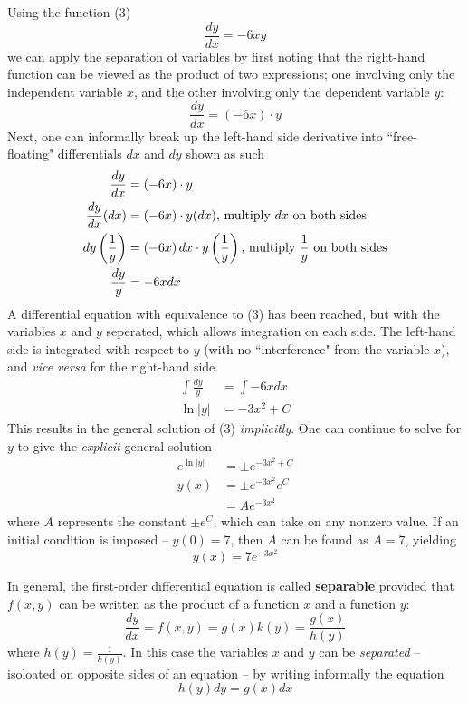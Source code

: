 \documentclass{article}
\begin{document}
Using the function (3)
$$ \frac{dy}{dx} = -6xy $$
we can apply the separation of variables by first noting that the right-hand function can be viewed as the product of two expressions; one involving only the independent variable $ x $, and the other involving only the dependent variable $ y $:
\begin{equation}
    \frac{dy}{dx} = \left( -6x \right) \cdot y
\end{equation}
Next, one can informally break up the left-hand side derivative into ``free-floating" differentials $ dx $ and $ dy $ shown as such
\begin{align}
    \frac{dy}{dx} & = \left( -6x \right) \cdot y \\
    \frac{dy}{dx} (dx) & = \left( -6x \right) \cdot y (dx) \text{, multiply $ dx $ on both sides} \\
    dy \left( \frac{1}{y} \right) & = \left( -6x \right) dx \cdot y \left( \frac{1}{y} \right) \text{, multiply $ \frac{1}{y} $ on both sides} \\
    \frac{dy}{y} & = -6xdx
\end{align}
A differential equation with equivalence to (3) has been reached, but with the variables $ x $ and $ y $ seperated, which allows integration on each side. The left-hand side is integrated with respect to $ y $ (with no ``interference" from the variable $ x $), and \textit{vice versa} for the right-hand side.
\begin{align}
    \int \frac{dy}{y} & = \int -6xdx \\
    \ln|y| & = -3x^2 + C
\end{align}
This results in the general solution of (3) \textit{implicitly}. One can continue to solve for $ y $ to give the \textit{explicit} general solution
\begin{align}
    e^{\ln|y|} & = \pm e^{-3x^2 + C} \\
    y(x) & = \pm e^{-3x^2}e^C \\
         & = Ae^{-3x^2}
\end{align}
where $ A $ represents the constant $ \pm e^C $, which can take on any nonzero value. If an initial condition is imposed – $ y(0) = 7 $, then $ A $ can be found as $ A = 7 $, yielding
\begin{equation}
    y(x) = 7e^{-3x^2}
\end{equation}

\hr

In general, the first-order differential equation is called \textbf{separable} provided that $ f(x,y) $ can be written as the product of a function $ x $ and a function $ y $:
$$ \frac{dy}{dx} = f(x,y) = g(x)k(y) = \frac{g(x)}{h(y)} $$
where $ h(y) = \frac{1}{k(y)} $. In this case the variables $ x $ and $ y $ can be \textit{separated} – isoloated on opposite sides of an equation – by writing informally the equation
$$ h(y)dy = g(x)dx $$
\end{document}
